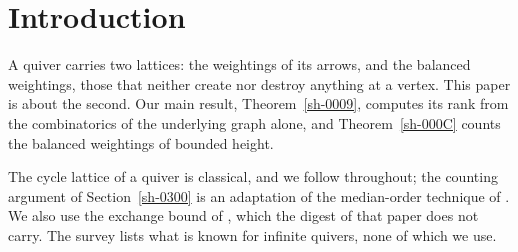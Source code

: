 \section{Introduction}\label{sh-0100}

A quiver carries two lattices: the weightings of its arrows, and the balanced weightings, those that neither create nor destroy anything at a vertex. This paper is about the second. Our main result, Theorem~\ref{sh-0009}, computes its rank from the combinatorics of the underlying graph alone, and Theorem~\ref{sh-000C} counts the balanced weightings of bounded height.

The cycle lattice of a quiver is classical, and we follow \cite[Proposition 2.1]{Arden24} throughout; the counting argument of Section~\ref{sh-0300} is an adaptation of the median-order technique of \cite[Theorem 2.3]{Bellamy19}. We also use the exchange bound of \cite[Lemma 5.9]{Arden24}, which the digest of that paper does not carry. The survey \cite{Cortez07} lists what is known for infinite quivers, none of which we use.


